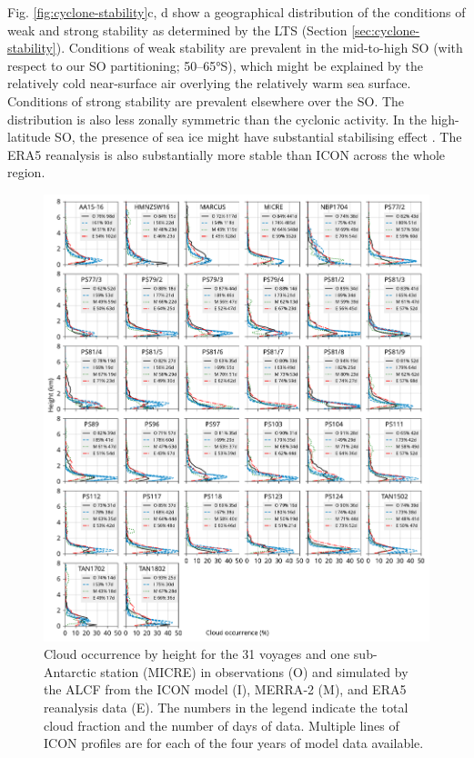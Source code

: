 \documentclass[draft]{agujournal2019}
\begin{document}
Fig. \ref{fig:cyclone-stability}c, d show a geographical distribution of the
conditions of weak and strong stability as determined by the LTS (Section
\ref{sec:cyclone-stability}). Conditions of weak stability are prevalent in the
mid-to-high SO (with respect to our SO partitioning; 50--65°S), which might be
explained by the relatively cold near-surface air overlying the relatively warm
sea surface. Conditions of strong stability are prevalent elsewhere over the
SO. The distribution is also less zonally symmetric than the cyclonic activity.
In the high-latitude SO, the presence of sea ice might have substantial
stabilising effect . The ERA5 reanalysis is also
substantially more stable than ICON across the whole region.

\begin{figure}[p!]
\centerline{
\includegraphics[width=1.06\textwidth]{img/cloud_occurrence_panel.pdf}
}
\caption{
Cloud occurrence by height for the 31 voyages and one sub-Antarctic
station (MICRE) in observations (O) and simulated by the ALCF from the ICON
model (I), MERRA‐2 (M), and ERA5 reanalysis data (E). The numbers in the legend
indicate the total cloud fraction and the number of days of data. Multiple lines
of ICON profiles are for each of the four years of model data available.
}
\label{fig:cloud-occurrence-panel}
\end{figure}
\end{document}
